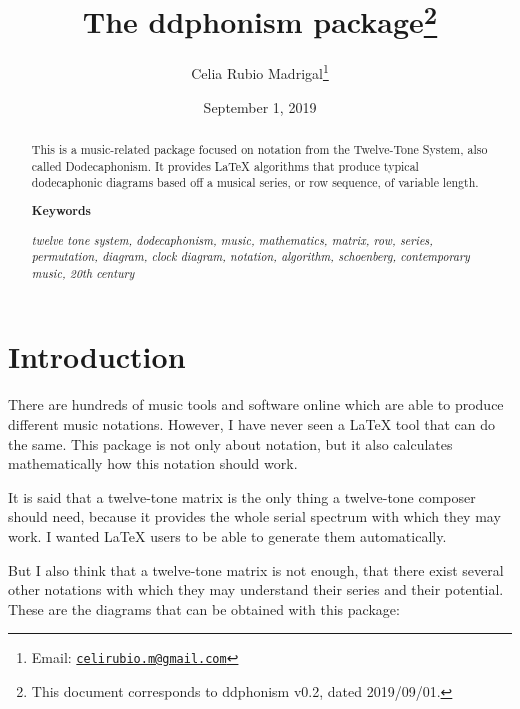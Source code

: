 \documentclass{article}
\title{The \textsf{ddphonism} package\footnote{This
		document corresponds to \textsf{ddphonism} v0.2, dated 2019/09/01.}}
\author{Celia Rubio Madrigal\footnote{Email: \href{mailto:celirubio.m@gmail.com}{\texttt{celirubio.m@gmail.com}}}}
\date{September 1, 2019}
\begin{document}
	
	\maketitle
	
	\begin{abstract}
		This is a music-related package focused on notation from the Twelve-Tone System, also called Dodecaphonism. It provides \LaTeX{} algorithms that produce typical dodecaphonic diagrams based off a musical series, or row sequence, of variable length.
		
		\begin{center}
			\textbf{Keywords}
		\end{center}
	
		\textit{twelve tone system, dodecaphonism, music, mathematics, matrix, row, series, permutation, diagram, clock diagram, notation, algorithm, schoenberg, contemporary music, 20th century}
	\end{abstract}

	\tableofcontents
	
	\section{Introduction}
	There are hundreds of music tools and software online which are able to produce different music notations. However, I have never seen a \LaTeX{} tool that can do the same. This package is not only about notation, but it also calculates mathematically how this notation should work.
	
	It is said that a twelve-tone matrix is the only thing a twelve-tone composer should need, because it provides the whole serial spectrum with which they may work. I wanted \LaTeX{} users to be able to generate them automatically.
	
	But I also think that a twelve-tone matrix is not enough, that there exist several other notations with which they may understand their series and their potential. These are the diagrams that can be obtained with this package:
	
	\begin{multicols}{2}
		
		
		
		
		\bigskip
	\end{multicols}
	
\end{document}
